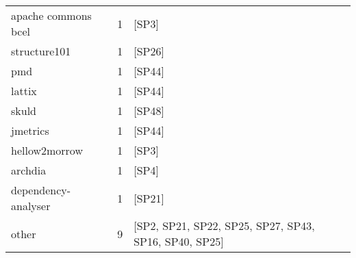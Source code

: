 \begin{tabular}{lrl}
 apache commons bcel &      1 &                                                  [SP3] \\
        structure101 &      1 &                                                 [SP26] \\
                 pmd &      1 &                                                 [SP44] \\
              lattix &      1 &                                                 [SP44] \\
               skuld &      1 &                                                 [SP48] \\
            jmetrics &      1 &                                                 [SP44] \\
       hellow2morrow &      1 &                                                  [SP3] \\
             archdia &      1 &                                                  [SP4] \\
 dependency-analyser &      1 &                                                 [SP21] \\
               other &      9 &  [SP2, SP21, SP22, SP25, SP27, SP43, SP16, SP40, SP25] \\
\bottomrule
\end{tabular}
